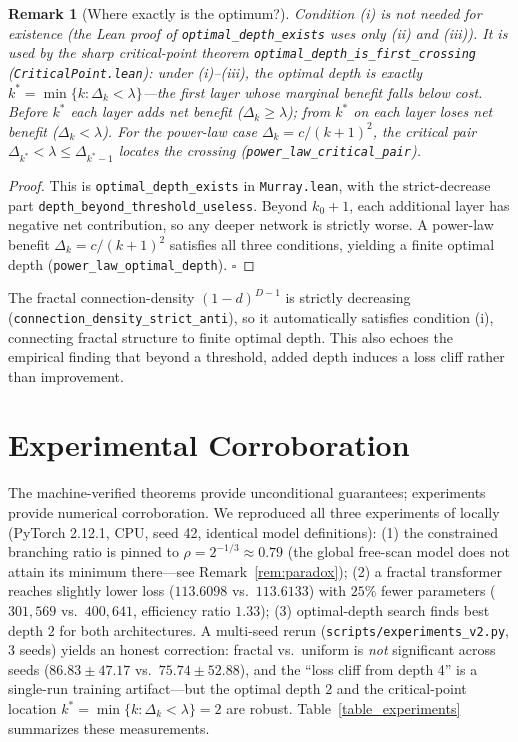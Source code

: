 \documentclass[conference]{IEEEtran}
\newtheorem{remark}{Remark}
\begin{document}
\begin{remark}[Where exactly is the optimum?]
\label{rem:critical}
Condition (i) is not needed for existence (the Lean proof of
\texttt{optimal\_depth\_exists} uses only (ii) and (iii)). It is used by the
sharp critical-point theorem \texttt{optimal\_depth\_is\_first\_crossing}
(\texttt{CriticalPoint.lean}): under (i)--(iii), the optimal depth is exactly
$k^*=\min\{k:\Delta_k<\lambda\}$---the first layer whose marginal benefit falls
below cost. Before $k^*$ each layer adds net benefit ($\Delta_k\ge\lambda$);
from $k^*$ on each layer loses net benefit ($\Delta_k<\lambda$). For the
power-law case $\Delta_k=c/(k+1)^2$, the critical pair
$\Delta_{k^*}<\lambda\le\Delta_{k^*-1}$ locates the crossing
(\texttt{power\_law\_critical\_pair}).
\end{remark}

\begin{proof}
This is \texttt{optimal\_depth\_exists} in \texttt{Murray.lean}, with the
strict-decrease part \texttt{depth\_beyond\_threshold\_useless}. Beyond
$k_0+1$, each additional layer has negative net contribution, so any deeper
network is strictly worse. A power-law benefit $\Delta_k=c/(k+1)^2$ satisfies
all three conditions, yielding a finite optimal depth
(\texttt{power\_law\_optimal\_depth}). \hfill$\square$
\end{proof}

The fractal connection-density $(1-d)^{D-1}$ is strictly decreasing
(\texttt{connection\_density\_strict\_anti}), so it automatically satisfies
condition (i), connecting fractal structure to finite optimal depth. This also
echoes the empirical finding that beyond a threshold, added depth induces a loss
cliff rather than improvement.

\section{Experimental Corroboration}
\label{sec:experiments}
The machine-verified theorems provide unconditional guarantees; experiments
provide numerical corroboration. We reproduced all three experiments of
\cite{shape2026} locally (PyTorch 2.12.1, CPU, seed 42, identical model
definitions): (1) the constrained branching ratio is pinned to
$\rho=2^{-1/3}\approx0.79$ (the global free-scan model does not attain its
minimum there---see Remark~\ref{rem:paradox}); (2) a fractal transformer
reaches slightly lower loss ($113.6098$ vs.\ $113.6133$) with $25\%$ fewer
parameters ($301{,}569$ vs.\ $400{,}641$, efficiency ratio $1.33$);
(3) optimal-depth search finds best depth $2$ for both architectures.
A multi-seed rerun (\texttt{scripts/experiments\_v2.py}, 3 seeds) yields an
honest correction: fractal vs.\ uniform is \emph{not} significant across
seeds ($86.83\pm47.17$ vs.\ $75.74\pm52.88$), and the ``loss cliff from
depth 4'' is a single-run training artifact---but the optimal depth $2$ and
the critical-point location $k^*=\min\{k:\Delta_k<\lambda\}=2$ are robust.
Table~\ref{table_experiments} summarizes these measurements.
\end{document}
